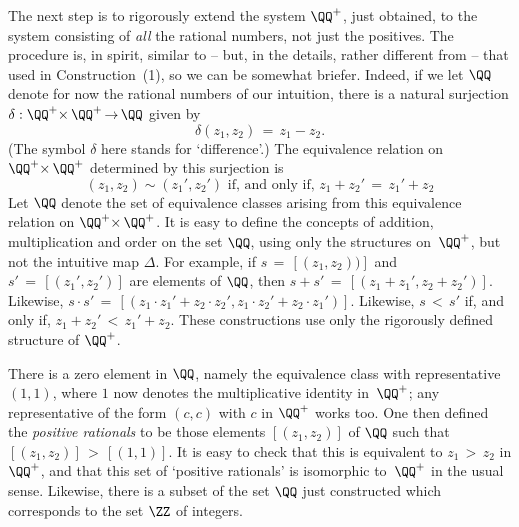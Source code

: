 { \V

        The next step is to rigorously extend the system ${\QQ}^{+}$, just obtained,
    to the system consisting of {\em all} the rational numbers, not just the positives.
    The procedure is, in spirit, similar to -- but, in the details, rather different from -- that used in Construction~(1), so we can be somewhat briefer.
    Indeed, if we let ${\QQ}$ denote for now the rational numbers of our intuition,
    there is a natural surjection ${\delta}:{\QQ}^{+}{\times}\,{\QQ}^{+}  \,{\rightarrow}\,  {\QQ}$ given by
        \begin{displaymath}
        {\delta}(z_{1},z_{2}) \,=\, z_{1} - z_{2}.
        \end{displaymath}
    (The symbol ${\delta}$ here stands for `difference'.) The equivalence relation on ${\QQ}^{+}{\times}\,{\QQ}^{+}$ determined by this surjection is
        \begin{displaymath}
        (z_{1},z_{2}){\sim}(z_{1}',z_{2}') \mbox{ if, and only if, }
        z_{1} + z_{2}' \,=\, z_{1}' + z_{2}
        \end{displaymath}
    Let ${\QQ}$ denote the set of equivalence classes arising from this equivalence relation on ${\QQ}^{+}{\times}\,{\QQ}^{+}$.
    It is easy to define the concepts of addition, multiplication and order on the set ${\QQ}$,
    using only the structures on~${\QQ}^{+}$, but not the intuitive map ${\Delta}$.
    For example, if $s \,=\, [(z_{1},z_{2}))]$ and $s' \,=\, [(z_{1}',z_{2}')]$ are elements of ${\QQ}$,
    then $s+s' \,=\, [(z_{1} + z_{1}', z_{2} + z_{2}')]$. Likewise, $s{\cdot}s' \,=\, [(z_{1}{\cdot}z_{1}' + z_{2}{\cdot}z_{2}', z_{1}{\cdot}z_{2}' + z_{2}{\cdot}z_{1}')]$.
    Likewise, $s\,<\,s'$ if, and only if, $z_{1} + z_{2}'\,<\,z_{1}' + z_{2}$. These constructions use only the rigorously defined structure of ${\QQ}^{+}$.

        There is a zero element in ${\QQ}$, namely the equivalence class with representative $(1,1)$,
    where $1$ now denotes the multiplicative identity in~${\QQ}^{+}$; any representative of the form $(c,c)$ with $c$ in ${\QQ}^{+}$ works too.
    One then defined the {\em positive rationals} to be those elements $[(z_{1},z_{2})]$ of ${\QQ}$ such that $[(z_{1},z_{2})]\,>\,[(1,1)]$.
    It is easy to check that this is equivalent to $z_{1}\,>\,z_{2}$ in ${\QQ}^{+}$,
    and that this set of `positive rationals' is isomorphic to~${\QQ}^{+}$ in the usual sense.
    Likewise, there is a subset of the set ${\QQ}$ just constructed which corresponds to the set ${\ZZ}$ of integers.

}
